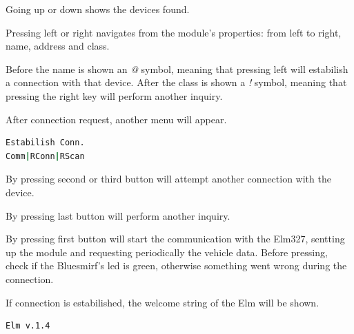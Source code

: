 \documentclass[twoside]{article}
\begin{document}
\begin{multicols}{2}
Going up or down shows the devices found.

Pressing left or right navigates from the module's properties: from left to right, name, address and class.

Before the name is shown an \emph{@} symbol, meaning that pressing left will estabilish a connection with that device.
After the class is shown a \emph{!} symbol, meaning that pressing the right key will perform another inquiry.

After connection request, another menu will appear.

\begin{lstlisting}[language=bash]
Estabilish Conn.
Comm|RConn|RScan
\end{lstlisting}

By pressing second or third button will attempt another connection with the device.

By pressing last button will perform another inquiry.

By pressing first button will start the communication with the Elm327, sentting up the module and requesting periodically the vehicle data. Before pressing, check if the Bluesmirf's led is green, otherwise something went wrong during the connection.

If connection is estabilished, the welcome string of the Elm will be shown.

\begin{lstlisting}[language=bash]
Elm v.1.4
\end{lstlisting}







\end{multicols}
\end{document}
